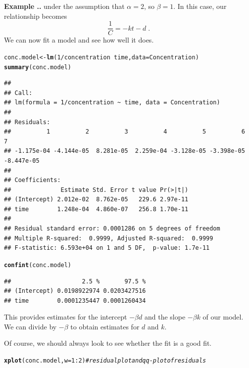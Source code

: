 \documentclass[twoside]{book}\usepackage[]{graphicx}\usepackage[]{xcolor}
\makeatletter
\newcommand{\hlnum}[1]{\textcolor[rgb]{0.686,0.059,0.569}{#1}}%
\newcommand{\hlcom}[1]{\textcolor[rgb]{0.678,0.584,0.686}{\textit{#1}}}%
\newcommand{\hlopt}[1]{\textcolor[rgb]{0,0,0}{#1}}%
\newcommand{\hlstd}[1]{\textcolor[rgb]{0.345,0.345,0.345}{#1}}%
\newcommand{\hlkwb}[1]{\textcolor[rgb]{0.69,0.353,0.396}{#1}}%
\newcommand{\hlkwc}[1]{\textcolor[rgb]{0.333,0.667,0.333}{#1}}%
\newcommand{\hlkwd}[1]{\textcolor[rgb]{0.737,0.353,0.396}{\textbf{#1}}}%
\newenvironment{kframe}{%
 \def\at@end@of@kframe{}%
 \ifinner\ifhmode%
  \def\at@end@of@kframe{\end{minipage}}%
  \begin{minipage}{\columnwidth}%
 \fi\fi%
 \def\FrameCommand##1{\hskip\@totalleftmargin \hskip-\fboxsep
 \colorbox{shadecolor}{##1}\hskip-\fboxsep
     \hskip-\linewidth \hskip-\@totalleftmargin \hskip\columnwidth}%
 \MakeFramed {\advance\hsize-\width
   \@totalleftmargin\z@ \linewidth\hsize
   \@setminipage}}%
 {\par\unskip\endMakeFramed%
 \at@end@of@kframe}
\newenvironment{knitrout}{}{} %
\newcounter{example}[section]
\newenvironment{example}%
{\refstepcounter{example}%
\textbf{Example \thesection.\arabic{example}. }}%
{}
\makeatother
\begin{document}
\begin{example}
\begin{knitrout}
\end{knitrout}
under the assumption that 
$\alpha=2$, so $\beta = 1$.  In this case, our relationship becomes
\[
\frac{1}{C}  = - k t - d \;.
 \]
We can now fit a model and see how well it does.
\begin{knitrout}
\color{fgcolor}\begin{kframe}
\begin{alltt}
\hlstd{conc.model} \hlkwb{<-} \hlkwd{lm}\hlstd{(} \hlnum{1}\hlopt{/}\hlstd{concentration} \hlopt{~} \hlstd{time,} \hlkwc{data}\hlstd{=Concentration)}
\hlkwd{summary}\hlstd{(conc.model)}
\end{alltt}
\begin{verbatim}
## 
## Call:
## lm(formula = 1/concentration ~ time, data = Concentration)
## 
## Residuals:
##          1          2          3          4          5          6          7 
## -1.175e-04 -4.144e-05  8.281e-05  2.259e-04 -3.128e-05 -3.398e-05 -8.447e-05 
## 
## Coefficients:
##              Estimate Std. Error t value Pr(>|t|)
## (Intercept) 2.012e-02  8.762e-05   229.6 2.97e-11
## time        1.248e-04  4.860e-07   256.8 1.70e-11
## 
## Residual standard error: 0.0001286 on 5 degrees of freedom
## Multiple R-squared:  0.9999,	Adjusted R-squared:  0.9999 
## F-statistic: 6.593e+04 on 1 and 5 DF,  p-value: 1.7e-11
\end{verbatim}
\begin{alltt}
\hlkwd{confint}\hlstd{(conc.model)}
\end{alltt}
\begin{verbatim}
##                    2.5 %       97.5 %
## (Intercept) 0.0198922974 0.0203427516
## time        0.0001235447 0.0001260434
\end{verbatim}
\end{kframe}
\end{knitrout}
This provides estimates for 
the intercept $- \beta d$ 
and the slope $- \beta k$ 
of our model.
We can divide by $-\beta$ to obtain estimates for $d$ and $k$.

Of course, we should always look to see whether the fit is a good fit.
\begin{knitrout}
\color{fgcolor}\begin{kframe}
\begin{alltt}
\hlkwd{xplot}\hlstd{(conc.model,} \hlkwc{w}\hlstd{=}\hlnum{1}\hlopt{:}\hlnum{2}\hlstd{)}  \hlcom{# residual plot and qq-plot of residuals}
\end{alltt}
\end{kframe}


\end{knitrout}
\end{example}
\end{document}
